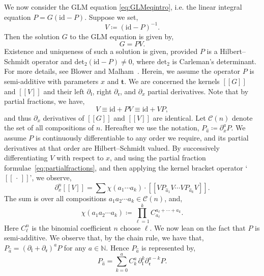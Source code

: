 \documentclass[5p,twocolumn]{elsarticle}
\newcommand*{\id}{{\mathrm{id}}}
\newcommand*{\pa}{{\partial}}
\newcommand*{\lb}{[\![}
\newcommand*{\rb}{]\!]}
\newcommand*{\tbf}{\boldsymbol{t}}
\newcommand*{\el}{\mathfrak l}
\newcommand*{\rl}{\mathfrak r}
\begin{document}
We now consider the GLM equation \eqref{eq:GLMeqintro}, i.e.\/ the linear integral equation $P=G(\id-P)$.
Suppose we set, 
\begin{equation}\label{eq:defV}
V\coloneqq (\id-P)^{-1}.
\end{equation}
Then the solution $G$ to the GLM equation is given by, 
\begin{equation}\label{eq:defG}
G=PV.
\end{equation}
Existence and uniqueness of such a solution is given, provided $P$ is a Hilbert--Schmidt operator and $\mathrm{det}_2(\id-P)\neq0$,
where $\mathrm{det}_2$ is Carleman's determinant.
For more details, see Blower and Malham~\cite[Lemma~7]{BM-KP}.
Herein, we assume the operator $P$ is semi-additive with parameters $x$ and $\tbf$.
We are concerned the kernels $\lb G\rb$ and $\lb V\rb$ and their left $\pa_\el$, right $\pa_\rl$, and $\pa_x$ partial derivatives.
Note that by partial fractions, we have,
\begin{equation}\label{eq:partialfractions}
V\equiv\id+PV\equiv\id+VP,
\end{equation}
and thus $\pa_x$ derivatives of $\lb G\rb$ and $\lb V\rb$ are identical.
Let $\mathcal C(n)$ denote the set of all compositions of $n$. 
Hereafter we use the notation, $P_{\hat a}\coloneqq\pa_x^aP$.
We assume $P$ is continuously differentiable to any order we require, and its partial derivatives at that order are Hilbert--Schmidt valued.
By successively differentiating $V$ with respect to $x$, and using the partial fraction formulae~\eqref{eq:partialfractions}, and then applying the
kernel bracket operator `$\lb\,\cdot\,\rb$', we observe,
\begin{equation}\label{eq:expansion}
\pa_x^n\lb V\rb=\sum \chi(a_1\cdots a_k)\cdot\lb VP_{\hat{a}_1}V\cdots VP_{\hat{a}_k}V\rb.
\end{equation}
The sum is over all compositions $a_1a_2\cdots a_k\in\mathcal C(n)$, and, 
\begin{equation*}
  \chi(a_1a_2\cdots a_k)\coloneqq\prod_{\ell=1}^kC_{a_\ell}^{a_\ell+\cdots+a_k}.
\end{equation*}
Here $C_\ell^n$ is the binomial coefficient $n$ choose $\ell$. We now lean on the fact that $P$ is semi-additive.
We observe that, by the chain rule, we have that, $P_{\hat a}=(\pa_\el+\pa_{\rl})^aP$ for any $a\in\mathbb N$.
Hence $P_{\hat a}$ is represented by, 
\begin{equation}\label{eq:Leibnizexpansionorig}
P_{\hat a }=\sum_{k=0}^a C_{k}^a\,\pa_\el^k\pa_{\rl}^{a-k}P.
\end{equation}
\end{document}

